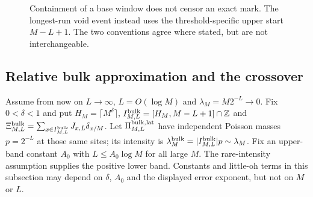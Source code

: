 \begin{figure}[htbp]\centering
{}
\caption{Containment of a base window does not censor an exact mark.
The longest-run void event instead uses the threshold-specific upper
start $M-L+1$. The two conventions agree where stated, but are not
interchangeable.}\label{fig:containment}
\end{figure}

\subsection{Relative bulk approximation and the crossover}
Assume from now on $L\to\infty$, $L=O(\log M)$ and
$\lambda_M=M2^{-L}\to0$. Fix $0<\delta<1$ and put
$H_M=\lceil M^\delta\rceil$,
$I^{\rm bulk}_{M,L}=[H_M,M-L+1]\cap\mathbb Z$ and
$\Xi^{\rm bulk}_{M,L}=\sum_{x\in I^{\rm bulk}_{M,L}}J_{x,L}\delta_{x/M}$.
Let $\Pi^{\rm bulk,lat}_{M,L}$ have independent Poisson masses $p=2^{-L}$
at those same sites; its intensity is
$\lambda_M^{\rm bulk}=|I^{\rm bulk}_{M,L}|p\sim\lambda_M$.
Fix an upper-band constant $A_0$ with $L\le A_0\log M$ for all large
$M$. The rare-intensity assumption supplies the positive lower band.
Constants and little-oh terms in this subsection may depend on
$\delta$, $A_0$ and the displayed error exponent, but not on $M$ or $L$.

